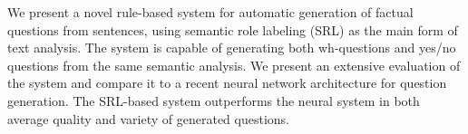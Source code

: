 We present a novel rule-based system for automatic generation of factual questions from sentences, using semantic role labeling (SRL) as the main form of text analysis. The system is capable of generating both wh-questions and yes/no questions from the same semantic analysis. We present an extensive evaluation of the system and compare it to a recent neural network architecture for question generation. The SRL-based system outperforms the neural system in both average quality and variety of generated questions.
